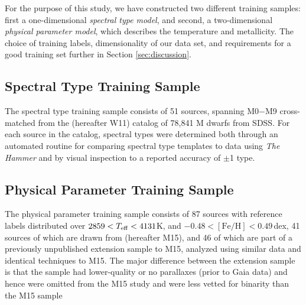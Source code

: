 \documentclass[twocolumn]{aastex62}
\newcommand{\feh}{[{\mathrm{Fe}/\mathrm{H}}]}
\begin{document}
For the purpose of this study, we have constructed two different training samples: first a one-dimensional \emph{spectral type model}, and second, a two-dimensional \emph{physical parameter model}, which describes the temperature and metallicity. The choice of training labels, dimensionality of our data set, and requirements for a good training set \color{red}{\bf are discussed }\color{black} further in Section \ref{sec:discussion}.

\subsection{Spectral Type Training Sample}

The spectral type training sample consists of 51 sources, spanning M0$-$M9 cross-matched from the \citet{West:2011} (hereafter W11) catalog of 78,841 M dwarfs from SDSS. For each source in the catalog, spectral types were determined both through an automated routine for comparing spectral type templates to data using \textsl{The Hammer} \citep{Covey:2007} and by visual inspection to a reported accuracy of $\pm$1 type.

\subsection{Physical Parameter Training Sample}

The physical parameter training sample consists of 87 sources with reference labels distributed over $2859 <T_{\rm eff} < 4131$K, and $-0.48 < \feh < 0.49$\,dex, 41 sources of which are drawn from \citet{Mann:2015} (hereafter M15), and 46 of which are part of a previously unpublished extension sample to M15, analyzed using similar data and identical techniques to M15. The major difference between the extension sample is that the sample had lower-quality or no parallaxes (prior to Gaia data) and hence were omitted from the M15 study and were less vetted for binarity than the M15 sample \color{red}{\bf (however, all sources in the training sample were visually inspected by color-magnitude position for binarity before addition).}\color{black}
\end{document}
